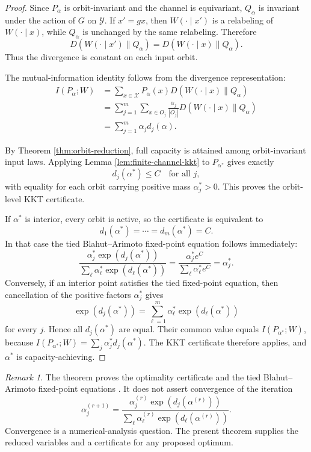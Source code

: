\documentclass[11pt]{article}
\theoremstyle{definition}
\theoremstyle{remark}
\newtheorem{remark}{Remark}
\newcommand{\1}{\mathbf 1}
\begin{document}
\begin{proof}
Since \(P_\alpha\) is orbit-invariant and the channel is equivariant, \(Q_\alpha\) is invariant under the action of \(G\) on \(\mathcal Y\).  If \(x'=gx\), then \(W(\cdot\mid x')\) is a relabeling of \(W(\cdot\mid x)\), while \(Q_\alpha\) is unchanged by the same relabeling.  Therefore
\[
  D(W(\cdot\mid x')\|Q_\alpha)=D(W(\cdot\mid x)\|Q_\alpha).
\]
Thus the divergence is constant on each input orbit.

The mutual-information identity follows from the divergence representation:
\[
\begin{aligned}
  I(P_\alpha;W)
  &=\sum_{x\in\mathcal X}P_\alpha(x)D(W(\cdot\mid x)\|Q_\alpha) \\
  &=\sum_{j=1}^m \sum_{x\in O_j}
    \frac{\alpha_j}{|O_j|}D(W(\cdot\mid x)\|Q_\alpha) \\
  &=\sum_{j=1}^m \alpha_j d_j(\alpha).
\end{aligned}
\]

By Theorem \ref{thm:orbit-reduction}, full capacity is attained among orbit-invariant input laws.  Applying Lemma \ref{lem:finite-channel-kkt} to \(P_{\alpha^*}\) gives exactly
\[
  d_j(\alpha^*)\le C\quad\text{for all }j,
\]
with equality for each orbit carrying positive mass \(\alpha_j^*>0\).  This proves the orbit-level KKT certificate.

If \(\alpha^*\) is interior, every orbit is active, so the certificate is equivalent to
\[
  d_1(\alpha^*)=\cdots=d_m(\alpha^*)=C.
\]
In that case the tied Blahut--Arimoto fixed-point equation follows immediately:
\[
  \frac{\alpha_j^*\exp(d_j(\alpha^*))}
       {\sum_\ell\alpha_\ell^*\exp(d_\ell(\alpha^*))}
  =\frac{\alpha_j^*e^C}{\sum_\ell\alpha_\ell^*e^C}
  =\alpha_j^*.
\]
Conversely, if an interior point satisfies the tied fixed-point equation, then cancellation of the positive factors \(\alpha_j^*\) gives
\[
  \exp(d_j(\alpha^*))=\sum_{\ell=1}^m\alpha_\ell^*\exp(d_\ell(\alpha^*))
\]
for every \(j\).  Hence all \(d_j(\alpha^*)\) are equal.  Their common value equals \(I(P_{\alpha^*};W)\), because \(I(P_{\alpha^*};W)=\sum_j\alpha_j^*d_j(\alpha^*)\).  The KKT certificate therefore applies, and \(\alpha^*\) is capacity-achieving.
\end{proof}

\begin{remark}
The theorem proves the optimality certificate and the tied Blahut--Arimoto fixed-point equations \cite{Blahut1972,Arimoto1972}.  It does not assert convergence of the iteration
\[
  \alpha_j^{(r+1)}=
  \frac{\alpha_j^{(r)}\exp(d_j(\alpha^{(r)}))}
       {\sum_\ell \alpha_\ell^{(r)}\exp(d_\ell(\alpha^{(r)}))}.
\]
Convergence is a numerical-analysis question.  The present theorem supplies the reduced variables and a certificate for any proposed optimum.
\end{remark}
\end{document}
